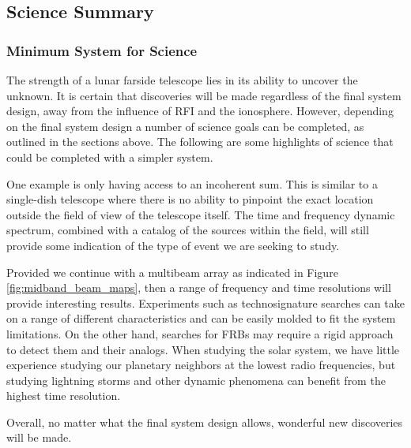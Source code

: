 \subsection{Science Summary}
\subsubsection{Minimum System for Science}
The strength of a lunar farside telescope lies in its ability to uncover the unknown. It is certain that discoveries will be made regardless of the final system design, away from the influence of RFI and the ionosphere. However, depending on the final system design a number of science goals can be completed, as outlined in the sections above. The following are some highlights of science that could be completed with a simpler system. 

One example is only having access to an incoherent sum. This is similar to a single-dish telescope where there is no ability to pinpoint the exact location outside the field of view of the telescope itself. The time and frequency dynamic spectrum, combined with a catalog of the sources within the field, will still provide some indication of the type of event we are seeking to study. 

Provided we continue with a multibeam array as indicated in Figure \ref{fig:midband_beam_maps}, then a range of frequency and time resolutions will provide interesting results. Experiments such as technosignature searches can take on a range of different characteristics and can be easily molded to fit the system limitations. On the other hand, searches for FRBs may require a rigid approach to detect them and their analogs. When studying the solar system, we have little experience studying our planetary neighbors at the lowest radio frequencies, but studying lightning storms and other dynamic phenomena can benefit from the highest time resolution.  

Overall, no matter what the final system design allows, wonderful new discoveries will be made.


